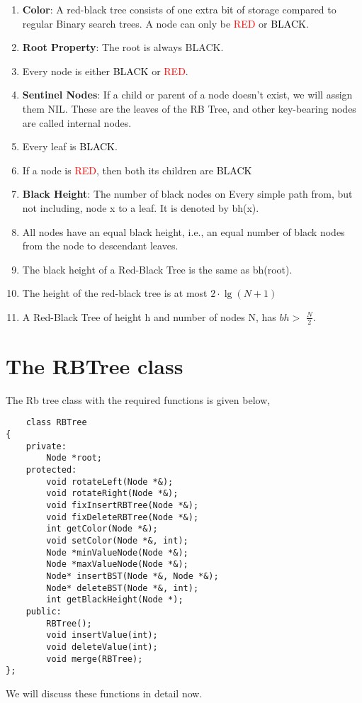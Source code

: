 \documentclass{article}
\begin{document}
\begin{enumerate}
    \item \textbf{Color}: A red-black tree consists of one extra bit of storage compared to regular Binary search trees. A node can only be \textcolor{red}{RED} or \textcolor{black}{BLACK}.
    \item \textbf{Root Property}: The root is always BLACK.
    \item Every node is either \textcolor{black}{BLACK} or \textcolor{red}{RED}.
    \item \textbf{Sentinel Nodes}: If a child or parent of a node doesn't exist, we will assign them NIL. These are the leaves of the RB Tree, and other key-bearing nodes are called internal nodes.
    \item Every leaf is \textcolor{black}{BLACK}.
    \item If a node is \textcolor{red}{RED}, then both its children are \textcolor{black}{BLACK}
    \item \textbf{Black Height}: The number of black nodes on Every simple path from, but not including, node x to a leaf. It is denoted by bh(x).
    \item All nodes have an equal black height, i.e., an equal number of black nodes from the node to descendant leaves.
    \item The black height of a Red-Black Tree is the same as bh(root).
    \item The height of the red-black tree is at most $2\cdot\lg(N+1)$
    \item A Red-Black Tree of height h and number of nodes N, has $bh >$  $\frac{N}{2}$. 
\end{enumerate}

\pagebreak

\section{The RBTree class}
The Rb tree class with the required functions is given below,
\begin{lstlisting}
    class RBTree
{
    private:
        Node *root;
    protected:
        void rotateLeft(Node *&);
        void rotateRight(Node *&);
        void fixInsertRBTree(Node *&);
        void fixDeleteRBTree(Node *&);
        int getColor(Node *&);
        void setColor(Node *&, int);
        Node *minValueNode(Node *&);
        Node *maxValueNode(Node *&);
        Node* insertBST(Node *&, Node *&);
        Node* deleteBST(Node *&, int);
        int getBlackHeight(Node *);
    public:
        RBTree();
        void insertValue(int);
        void deleteValue(int);
        void merge(RBTree);
};
\end{lstlisting}
We will discuss these functions in detail now.
\end{document}
